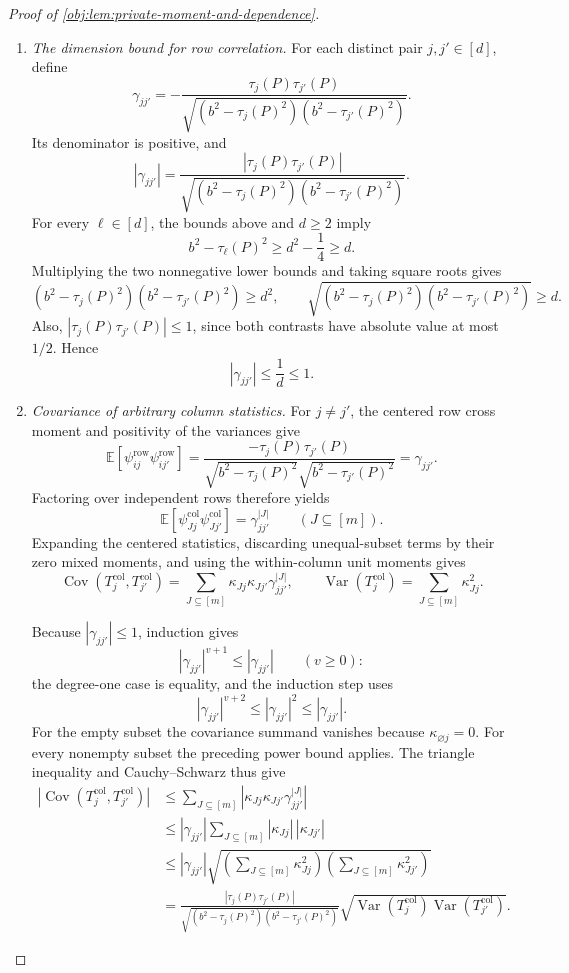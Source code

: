 \begin{proof}[Proof of \cref{obj:lem:private-moment-and-dependence}]
\begin{enumerate}
\item \textit{The dimension bound for row correlation.}
For each distinct pair \(j,j'\in[d]\), define
\[
\gamma_{jj'}
=
-\frac{\tau_j(P)\tau_{j'}(P)}
{\sqrt{(b^2-\tau_j(P)^2)(b^2-\tau_{j'}(P)^2)}}.
\]
Its denominator is positive, and
\[
|\gamma_{jj'}|
=
\frac{|\tau_j(P)\tau_{j'}(P)|}
{\sqrt{(b^2-\tau_j(P)^2)(b^2-\tau_{j'}(P)^2)}}.
\]
For every \(\ell\in[d]\), the bounds above and \(d\ge2\) imply
\[
b^2-\tau_\ell(P)^2
\ge d^2-\frac14
\ge d.
\]
Multiplying the two nonnegative lower bounds and taking square roots gives
\[
(b^2-\tau_j(P)^2)(b^2-\tau_{j'}(P)^2)\ge d^2,
\qquad
\sqrt{(b^2-\tau_j(P)^2)(b^2-\tau_{j'}(P)^2)}\ge d.
\]
Also, \(|\tau_j(P)\tau_{j'}(P)|\le1\), since both contrasts have
absolute value at most \(1/2\). Hence
\[
|\gamma_{jj'}|
\le\frac1d
\le1.
\]

\item \textit{Covariance of arbitrary column statistics.}
For \(j\ne j'\), the centered row cross moment and positivity of the
variances give
\[
\mathbb E[
\psi^{\mathrm{row}}_{ij}\psi^{\mathrm{row}}_{ij'}]
=
\frac{-\tau_j(P)\tau_{j'}(P)}
{\sqrt{b^2-\tau_j(P)^2}\sqrt{b^2-\tau_{j'}(P)^2}}
=
\gamma_{jj'}.
\]
Factoring over independent rows therefore yields
\[
\mathbb E[
\psi^{\mathrm{col}}_{Jj}\psi^{\mathrm{col}}_{Jj'}]
=
\gamma_{jj'}^{|J|}
\qquad(J\subseteq[m]).
\]
Expanding the centered statistics, discarding unequal-subset terms by
their zero mixed moments, and using the within-column unit moments gives
\[
\operatorname{Cov}(T_j^{\mathrm{col}},T_{j'}^{\mathrm{col}})
=
\sum_{J\subseteq[m]}
\kappa_{Jj}\kappa_{Jj'}\gamma_{jj'}^{|J|},
\qquad
\operatorname{Var}(T_j^{\mathrm{col}})
=
\sum_{J\subseteq[m]}\kappa_{Jj}^2.
\]

Because \(|\gamma_{jj'}|\le1\), induction gives
\[
|\gamma_{jj'}|^{v+1}\le|\gamma_{jj'}|
\qquad(v\ge0):
\]
the degree-one case is equality, and the induction step uses
\[
|\gamma_{jj'}|^{v+2}
\le|\gamma_{jj'}|^2
\le|\gamma_{jj'}|.
\]
For the empty subset the covariance summand vanishes because
\(\kappa_{\varnothing j}=0\). For every nonempty subset the preceding
power bound applies. The triangle inequality and Cauchy--Schwarz thus give
\[
\begin{aligned}
\left|
\operatorname{Cov}(T_j^{\mathrm{col}},T_{j'}^{\mathrm{col}})
\right|
&\le
\sum_{J\subseteq[m]}
\left|\kappa_{Jj}\kappa_{Jj'}\gamma_{jj'}^{|J|}\right|\\
&\le
|\gamma_{jj'}|
\sum_{J\subseteq[m]}|\kappa_{Jj}|\,|\kappa_{Jj'}|\\
&\le
|\gamma_{jj'}|
\sqrt{\left(\sum_{J\subseteq[m]}\kappa_{Jj}^2\right)
      \left(\sum_{J\subseteq[m]}\kappa_{Jj'}^2\right)}\\
&=
\frac{|\tau_j(P)\tau_{j'}(P)|}
{\sqrt{(b^2-\tau_j(P)^2)(b^2-\tau_{j'}(P)^2)}}
\sqrt{\operatorname{Var}(T_j^{\mathrm{col}})
      \operatorname{Var}(T_{j'}^{\mathrm{col}})}.
\end{aligned}
\]


\end{enumerate}
\end{proof}

